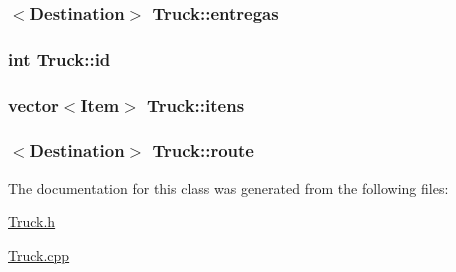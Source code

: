 \subsubsection[{entregas}]{$<${\bf Destination}$>$ Truck\+::entregas\hspace{0.3cm}{\ttfamily [protected]}}\label{class_truck_a2be9cfee5a2f2a059e913a537bfd415d}
\hypertarget{class_truck_a598e606d5c16e5664e222ad13c02db77}{}
\subsubsection[{id}]{\setlength{\rightskip}{0pt plus 5cm}int Truck\+::id\hspace{0.3cm}{\ttfamily [protected]}}\label{class_truck_a598e606d5c16e5664e222ad13c02db77}
\hypertarget{class_truck_a0f9b7ed803cef756b315319349cdef80}{}
\subsubsection[{itens}]{\setlength{\rightskip}{0pt plus 5cm}vector$<${\bf Item}$>$ Truck\+::itens\hspace{0.3cm}{\ttfamily [protected]}}\label{class_truck_a0f9b7ed803cef756b315319349cdef80}
\hypertarget{class_truck_a8f24dbb55babf8015864f4a453d1efd7}{}
\subsubsection[{route}]{$<${\bf Destination}$>$ Truck\+::route\hspace{0.3cm}{\ttfamily [protected]}}\label{class_truck_a8f24dbb55babf8015864f4a453d1efd7}


The documentation for this class was generated from the following files\+:\begin{DoxyCompactItemize}
\item 
\hyperlink{_truck_8h}{Truck.\+h}\item 
\hyperlink{_truck_8cpp}{Truck.\+cpp}\end{DoxyCompactItemize}
